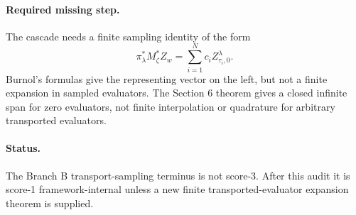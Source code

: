 \paragraph{Required missing step.}
The cascade needs a finite sampling identity of the form
\[
\pi_\lambda^\ast M_\zeta^\ast Z_w
=\sum_{i=1}^N c_i Z^\lambda_{\tau_i,0}.
\]
Burnol's formulas give the representing vector on the left, but not a finite
expansion in sampled evaluators.  The Section 6 theorem gives a closed infinite
span for zero evaluators, not finite interpolation or quadrature for arbitrary
transported evaluators.

\paragraph{Status.}
The Branch B transport-sampling terminus is not score-3.  After this audit it
is score-1 framework-internal unless a new finite transported-evaluator
expansion theorem is supplied.
